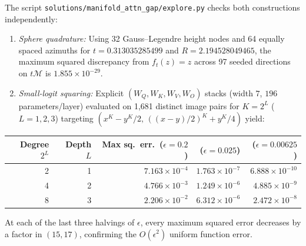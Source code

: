 \documentclass[11pt]{article}
\theoremstyle{plain}
\theoremstyle{definition}
\theoremstyle{remark}
\begin{document}
The script \texttt{solutions/manifold\_attn\_gap/explore.py} checks both constructions independently:
\begin{enumerate}[label=\textup{(\arabic*)},leftmargin=2em,itemsep=2pt]
\item \emph{Sphere quadrature:} Using 32 Gauss--Legendre height nodes and 64 equally spaced azimuths for $t = 0.313035285499$ and $R = 2.194528049465$, the maximum squared discrepancy from $f_t(z) = z$ across 97 seeded directions on $t\mathcal{M}$ is $1.855 \times 10^{-29}$.
\item \emph{Small-logit squaring:} Explicit $(W_Q, W_K, W_V, W_O)$ stacks (width $7$, $196$ parameters/layer) evaluated on 1,681 distinct image pairs for $K = 2^L$ ($L = 1, 2, 3$) targeting $(x^K - y^K/2,\, ((x-y)/2)^K + y^K/4)$ yield:
\end{enumerate}

\begin{table}[h]\centering\small
\begin{tabular}{rrrrr}
\toprule
Degree $2^L$ & Depth $L$ & Max sq.\ err.\ ($\epsilon = 0.2$) & ($\epsilon = 0.025$) & ($\epsilon = 0.00625$) \\
\midrule
2 & 1 & $7.163 \times 10^{-4}$ & $1.763 \times 10^{-7}$ & $6.888 \times 10^{-10}$ \\
4 & 2 & $4.766 \times 10^{-3}$ & $1.249 \times 10^{-6}$ & $4.885 \times 10^{-9}$ \\
8 & 3 & $2.206 \times 10^{-2}$ & $6.312 \times 10^{-6}$ & $2.472 \times 10^{-8}$ \\
\bottomrule
\end{tabular}
\end{table}

At each of the last three halvings of $\epsilon$, every maximum squared error decreases by a factor in $(15, 17)$, confirming the $O(\epsilon^2)$ uniform function error.
\end{document}
